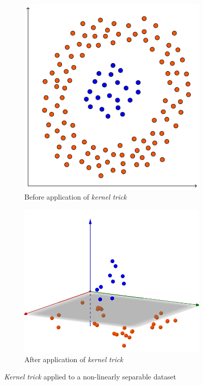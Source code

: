 \begin{figure}[t]
    \centering
    \begin{subfigure}[b]{0.45\textwidth}
        \includegraphics[width=\textwidth]{./figs/non_linearly_separable_classes}
        \caption{Before application of \textit{kernel trick}}
        \label{fig:non_linearly_separable_2d}
    \end{subfigure}
    \begin{subfigure}[b]{0.45\textwidth}
        \includegraphics[width=\textwidth]{./figs/non_linearly_separable_classes_higher_dimension}
        \caption{After application of \textit{kernel trick}}
        \label{fig:non_linearly_separable_3d}
    \end{subfigure}
    \caption{\textit{Kernel trick} applied to a non-linearly separable dataset}
    \label{fig:non_linearly_separable_classes}
\end{figure}

